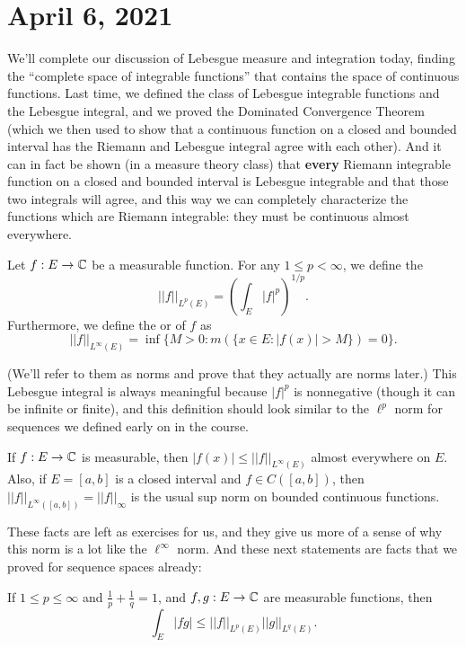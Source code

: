 \pagebreak\section{April 6, 2021}

We'll complete our discussion of Lebesgue measure and integration today, finding the ``complete space of integrable functions'' that contains the space of continuous functions. Last time, we defined the class of Lebesgue integrable functions and the Lebesgue integral, and we proved the Dominated Convergence Theorem (which we then used to show that a continuous function on a closed and bounded interval has the Riemann and Lebesgue integral agree with each other). And it can in fact be shown (in a measure theory class) that \textbf{every} Riemann integrable function on a closed and bounded interval is Lebesgue integrable and that those two integrals will agree, and this way we can completely characterize the functions which are Riemann integrable: they must be continuous almost everywhere. 

\begin{definition}
Let $f: E \to \mathbb C$ be a measurable function. For any $1 \le p < \infty$, we define the 
\[
    ||f||_{L^p(E)} = \left(\int_E |f|^p\right)^{1/p}.
\]
Furthermore, we define the  or  of $f$ as
\[
    ||f||_{L^\infty(E)} = \inf\{M > 0: m(\{x \in E: |f(x)| > M \}) = 0\}.
\]
\end{definition}

(We'll refer to them as norms and prove that they actually are norms later.) This Lebesgue integral is always meaningful because $|f|^p$ is nonnegative (though it can be infinite or finite), and this definition should look similar to the $\ell^p$ norm for sequences we defined early on in the course.

\begin{proposition}
If $f: E \to \mathbb C$ is measurable, then $|f(x)| \le ||f||_{L^{\infty}(E)}$ almost everywhere on $E$. Also, if $E = [a, b]$ is a closed interval and $f \in C([a, b])$, then $||f||_{L^\infty([a, b])} = ||f||_{\infty}$ is the usual sup norm on bounded continuous functions.
\end{proposition}

These facts are left as exercises for us, and they give us more of a sense of why this norm is a lot like the $\ell^{\infty}$ norm. And these next statements are facts that we proved for sequence spaces already:

\begin{theorem}
If $1 \le p \le \infty$ and $\frac{1}{p} + \frac{1}{q} = 1$, and $f, g: E \to \mathbb C$ are measurable functions, then
\[
    \int_E |fg| \le ||f||_{L^p(E)} ||g||_{L^q(E)}.
\]
\end{theorem} 

